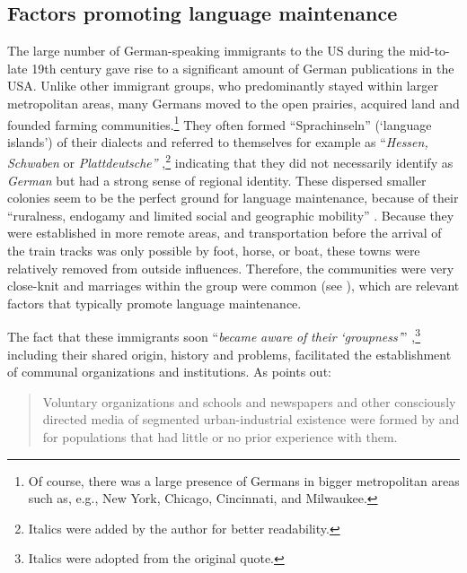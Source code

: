 \documentclass[output=paper]{langsci/langscibook}
\begin{document}
\subsection{Factors promoting language maintenance} %
\label{sec:rocker:2.1}

The large number of German-speaking immigrants to the US during the mid-to-late 19th century gave rise to a significant amount of German publications in the USA. Unlike other immigrant groups, who predominantly stayed within larger metropolitan areas, many Germans moved to the open prairies, acquired land and founded farming communities.\footnote{Of course, there was a large presence of Germans in bigger metropolitan areas such as, e.g., New York, Chicago, Cincinnati, and Milwaukee.} They often formed “Sprachinseln” (‘language islands’) of their dialects and referred to themselves for example as “\textit{Hessen,} \textit{Schwaben} or \textit{Plattdeutsche”} \citep[501]{Langer2008},\footnote{Italics were added by the author for better readability.} indicating that they did not necessarily identify as \textit{German} but had a strong sense of regional identity. These dispersed smaller colonies seem to be the perfect ground for language maintenance, because of their “ruralness, endogamy and limited social and geographic mobility” \citep[133]{Louden2006}. Because they were established in more remote areas, and transportation before the arrival of the train tracks was only possible by foot, horse, or boat, these towns were relatively removed from outside influences. Therefore, the communities were very close-knit and marriages within the group were common (see \citealt{Kehlenbeck1948}), which are relevant factors that typically promote language maintenance.

The fact that these immigrants soon “\textit{became} \textit{aware} \textit{of} \textit{their} \textit{‘groupness’}” \citep[27]{Fishman1966},\footnote{Italics were adopted from the original quote.} including their shared origin, history and problems, facilitated the establishment of communal organizations and institutions. As \citet[27]{Fishman1966} points out:

\begin{quote}
Voluntary organizations and schools and newspapers and other consciously directed media of segmented urban-industrial existence were formed by and for populations that had little or no prior experience with them.
\end{quote}
\end{document}
